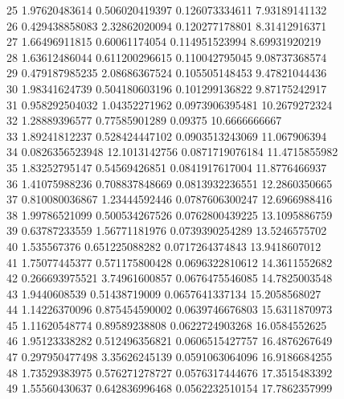 {25 1.97620483614 0.506020419397 0.126073334611 7.93189141132 \\
26 0.429438858083 2.32862020094 0.120277178801 8.31412916371 \\
27 1.66496911815 0.60061174054 0.114951523994 8.69931920219 \\
28 1.63612486044 0.611200296615 0.110042795045 9.08737368574 \\
29 0.479187985235 2.08686367524 0.105505148453 9.47821044436 \\
30 1.98341624739 0.504180603196 0.101299136822 9.87175242917 \\
31 0.958292504032 1.04352271962 0.0973906395481 10.2679272324 \\
32 1.28889396577 0.77585901289 0.09375 10.6666666667 \\
33 1.89241812237 0.528424447102 0.0903513243069 11.067906394 \\
34 0.0826356523948 12.1013142756 0.0871719076184 11.4715855982 \\
35 1.83252795147 0.54569426851 0.0841917617004 11.8776466937 \\
36 1.41075988236 0.708837848669 0.0813932236551 12.2860350665 \\
37 0.810080036867 1.23444592446 0.0787606300247 12.6966988416 \\
38 1.99786521099 0.500534267526 0.0762800439225 13.1095886759 \\
39 0.63787233559 1.56771181976 0.0739390254289 13.5246575702 \\
40 1.535567376 0.651225088282 0.0717264374843 13.9418607012 \\
41 1.75077445377 0.571175800428 0.0696322810612 14.3611552682 \\
42 0.266693975521 3.74961600857 0.0676475546085 14.7825003548 \\
43 1.9440608539 0.51438719009 0.0657641337134 15.2058568027 \\
44 1.14226370096 0.875454590002 0.0639746676803 15.6311870973 \\
45 1.11620548774 0.89589238808 0.0622724903268 16.0584552625 \\
46 1.95123338282 0.512496356821 0.0606515427757 16.4876267649 \\
47 0.297950477498 3.35626245139 0.0591063064096 16.9186684255 \\
48 1.73529383975 0.576271278727 0.0576317444676 17.3515483392 \\
49 1.55560430637 0.642836996468 0.0562232510154 17.7862357999 \\
}
